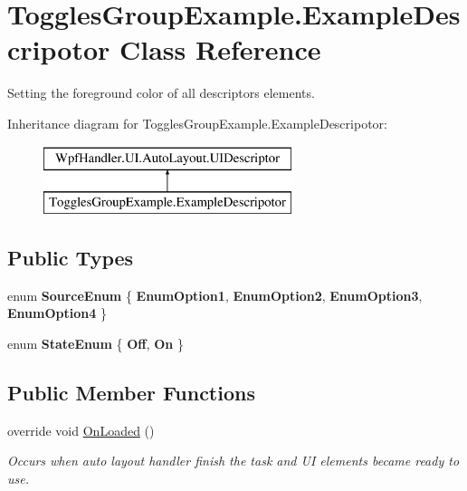 \hypertarget{class_toggles_group_example_1_1_example_descripotor}{}\section{Toggles\+Group\+Example.\+Example\+Descripotor Class Reference}
\label{class_toggles_group_example_1_1_example_descripotor}


Setting the foreground color of all descriptor\textquotesingle{}s elements.  


Inheritance diagram for Toggles\+Group\+Example.\+Example\+Descripotor\+:\begin{figure}[H]
\begin{center}
\leavevmode
\includegraphics[height=2.000000cm]{d3/da7/class_toggles_group_example_1_1_example_descripotor}
\end{center}
\end{figure}
\subsection*{Public Types}
\begin{DoxyCompactItemize}
\item 
\mbox{\label{class_toggles_group_example_1_1_example_descripotor_a15caaffbcd9ccbcb127af63aca018295}} 
enum {\bfseries Source\+Enum} \{ {\bfseries Enum\+Option1}, 
{\bfseries Enum\+Option2}, 
{\bfseries Enum\+Option3}, 
{\bfseries Enum\+Option4}
 \}
\item 
\mbox{\label{class_toggles_group_example_1_1_example_descripotor_ae2f7ed06e3317d33ee9907b12ea3619d}} 
enum {\bfseries State\+Enum} \{ {\bfseries Off}, 
{\bfseries On}
 \}
\end{DoxyCompactItemize}
\subsection*{Public Member Functions}
\begin{DoxyCompactItemize}
\item 
override void \mbox{\hyperlink{class_toggles_group_example_1_1_example_descripotor_a819096dc88f0d032a71835bd14f28eab}{On\+Loaded}} ()
\begin{DoxyCompactList}\small\item\em Occurs when auto layout handler finish the task and UI elements became ready to use. \end{DoxyCompactList}\end{DoxyCompactItemize}

